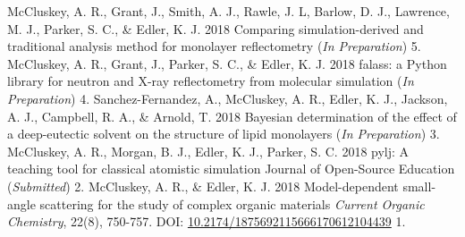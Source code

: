 \begin{cvpubys}
  \cvpuby
	{McCluskey, A. R., Grant, J., Smith, A. J., Rawle, J. L, Barlow, D. J., Lawrence, M. J., Parker, S. C., \& Edler, K. J.}
    {2018}
    {Comparing simulation-derived and traditional analysis method for monolayer reflectometry}
    {(\emph{In Preparation})}
    {5.}
  \cvpuby
    {McCluskey, A. R., Grant, J., Parker, S. C., \& Edler, K. J.}
    {2018}
    {falass: a Python library for neutron and X-ray reflectometry from molecular simulation}
    {(\emph{In Preparation})}
    {4.}
  \cvpuby
    {Sanchez-Fernandez, A., McCluskey, A. R., Edler, K. J., Jackson, A. J., Campbell, R. A., \& Arnold, T.}
    {2018}
    {Bayesian determination of the effect of a deep-eutectic solvent on the structure of lipid monolayers}
    {(\emph{In Preparation})}
    {3.}
  \cvpuby
	{McCluskey, A. R., Morgan, B. J., Edler, K. J., Parker, S. C.}
	{2018}
	{pylj: A teaching tool for classical atomistic simulation}
	{Journal of Open-Source Education (\emph{Submitted})}
	{2.}
  \cvpuby
    {McCluskey, A. R., \& Edler, K. J.}
    {2018}
    {Model-dependent small-angle scattering for the study of complex organic materials}
	{\emph{Current Organic Chemistry}, 22(8), 750-757. DOI: \href{10.2174/1875692115666170612104439}{10.2174/1875692115666170612104439}}
    {1.}
\end{cvpubys}
